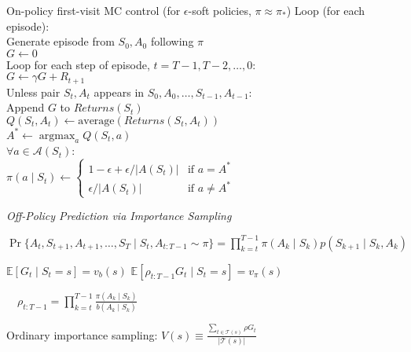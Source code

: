 \documentclass[twocolumn]{article}
\DeclareMathOperator*{\argmax}{argmax}
\begin{document}
\begin{mydef}{On-policy first-visit MC control (for $\epsilon$-soft policies, $\pi \approx \pi_*$)}{}
    Loop (for each episode): \\
        \hspace*{2em}Generate episode from $S_0, A_0$ following $\pi$ \\
        \hspace*{2em}$G \leftarrow 0$ \\
        \hspace*{2em}Loop for each step of episode, $t = T-1, T-2, \dots, 0$: \\
            \hspace*{4em}$G \leftarrow \gamma G + R_{t+1}$ \\
            \hspace*{4em}Unless pair $S_t, A_t$ appears in $S_0, A_0, \dots, S_{t-1}, A_{t-1}$: \\
                \hspace*{6em}Append $G$ to $Returns(S_t)$ \\
                \hspace*{6em}$Q(S_t, A_t) \leftarrow \text{average}(Returns(S_t, A_t))$ \\
                \hspace*{6em}$A^* \leftarrow \argmax_a Q(S_t, a)$ \\
                \hspace*{6em}$\forall a \in \mathcal A(S_t)$: \\
                    \hspace*{8em}$\pi(a \mid S_t) \leftarrow \begin{cases}
                        1 - \epsilon + \epsilon / |A(S_t)| & \text{if } a = A^* \\
                        \epsilon / |A(S_t)| & \text{if } a \neq A^*
                    \end{cases}$
\end{mydef}

\dotfill

\textit{Off-Policy Prediction via Importance Sampling}

$\Pr \{ A_t, S_{t+1}, A_{t+1}, \dots, S_T \mid S_t, A_{t:T-1} \sim \pi \} = \prod_{k=t}^{T-1} \pi(A_k \mid S_k) p(S_{k+1} \mid S_k, A_k)$

$\mathbb E [G_t \mid S_t = s] = v_b(s)$ \hfill $\mathbb E [\rho_{t:T-1} G_t \mid S_t = s] = v_\pi(s)$

$\quad \rho_{t:T-1} = \prod_{k=t}^{T-1} \frac{\pi(A_k \mid S_k)}{b(A_k \mid S_k)}$

Ordinary importance sampling: $V(s) \equiv \frac{\sum_{t \in \mathcal T(s)} \rho G_t}{|\mathcal T(s)|}$
\end{document}
